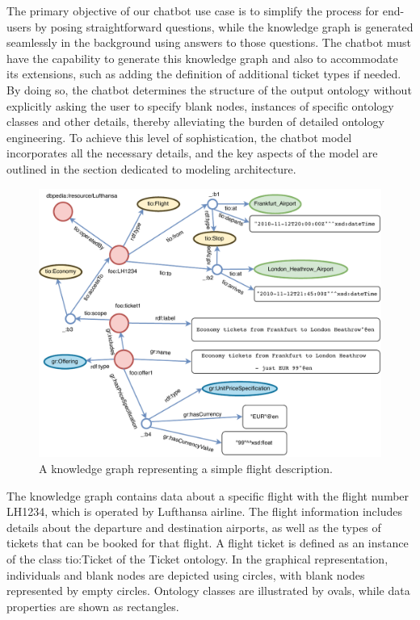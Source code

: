 \documentclass[runningheads]{llncs}
\begin{document}
The primary objective of our chatbot use case is to simplify the process for end-users by posing straightforward questions, while the knowledge graph is generated seamlessly in the background using answers to those questions. The chatbot must have the capability to generate this knowledge graph and also to accommodate its extensions, such as adding the definition of additional ticket types if needed. By doing so, the chatbot determines the structure of the output ontology without explicitly asking the user to specify blank nodes, instances of specific ontology classes and other details, thereby alleviating the burden of detailed ontology engineering. To achieve this level of sophistication, the chatbot model incorporates all the necessary details, and the key aspects of the model are outlined in the section dedicated to modeling architecture.
\begin{figure}[H]
  \centering
  \includegraphics[width=\linewidth]{img/use_case}
  \caption{A knowledge graph representing a simple flight description.}
  \label{fig:usecase}
\end{figure}


The knowledge graph contains data about a specific flight with the flight number LH1234, which is operated by Lufthansa airline. The flight information includes details about the departure and destination airports, as well as the types of tickets that can be booked for that flight. A flight ticket is defined as an instance of the class tio:Ticket of the Ticket ontology. In the graphical representation, individuals and blank nodes are depicted using circles, with blank nodes represented by empty circles. Ontology classes are illustrated by ovals, while data properties are shown as rectangles. 
\end{document}
